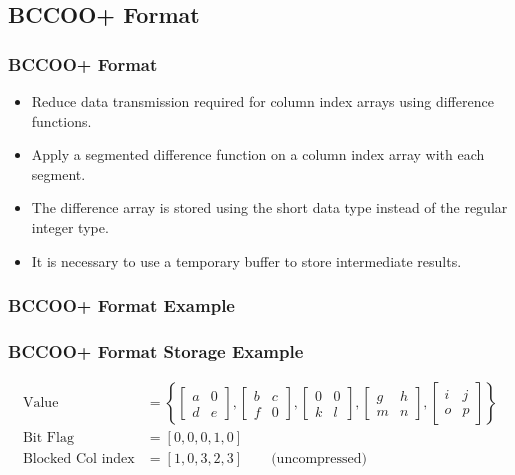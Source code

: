 \subsection{BCCOO+ Format}
\begin{frame}
	\frametitle{BCCOO+ Format}
	\begin{itemize}
		\item Reduce data transmission required for column index arrays
			using difference functions.
		\item Apply a segmented difference function on a column index array
			with each segment.
		\item The difference array is stored using the short data type 
			instead of the regular integer type.
		\item It is necessary to use a temporary buffer to store 
			intermediate results.
	\end{itemize}
\end{frame}

\begin{frame}
	\frametitle{BCCOO+ Format Example}
	
\end{frame}

\begin{frame}
	\frametitle{BCCOO+ Format Storage Example}
	\begin{align*}
		\text{Value} &= \left \{ \begin{bmatrix}
		a & 0\\ 
		d & e
		\end{bmatrix}, 
		\begin{bmatrix}
		b & c\\ 
		f & 0
		\end{bmatrix}, 
		\begin{bmatrix}
		0 & 0\\ 
		k & l
		\end{bmatrix}, 
		\begin{bmatrix}
		g & h\\ 
		m & n
		\end{bmatrix}, 
		\begin{bmatrix}
		i & j\\ 
		o & p
		\end{bmatrix}
		\right \} \\
		\text{Bit Flag}			 &= [0, 0, 0, 1, 0]	\\
		\text{Blocked Col index} &= [1, 0, 3, 2, 3] \qquad \text{(uncompressed)}\\
	\end{align*}
\end{frame}